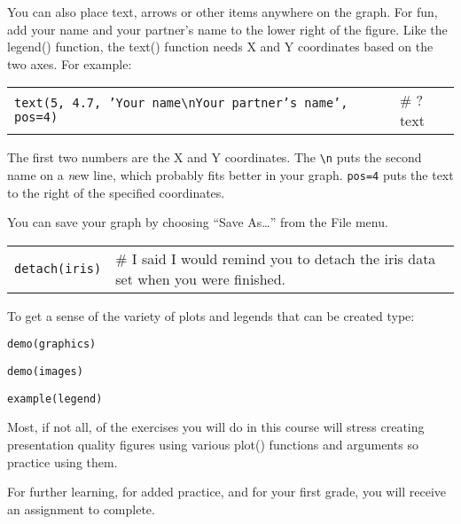 \documentclass[11pt]{article}
\begin{document}



You can also place text, arrows or other items anywhere on the graph.
For fun, add your name and your partner's name to the lower right of the
figure. Like the legend() function, the text() function needs X and Y
coordinates based on the two axes. For example:

\begin{tabular}{@{}L{4in}L{1.5in}@{}}
\texttt{text(5, 4.7, 'Your name\textbackslash{}nYour partner's name', pos=4)} & \# ?text\\

\end{tabular}

The first two numbers are the X and Y coordinates.  The \texttt{\textbackslash{}n} puts the second name on a \emph{n}ew line, which probably fits better in your graph. \texttt{pos=4} puts the text to the right of the specified coordinates.

You can save your graph by choosing ``Save As\ldots{}'' from the File
menu.

\begin{tabular}{@{}L{1in}L{4.5in}@{}}
\texttt{detach(iris)} & \# I said I would remind you to detach the iris data set
when you were finished. \\
\end{tabular}

To get a sense of the variety of plots and legends that can be created
type:

\texttt{demo(graphics)}

\texttt{demo(images)}

\texttt{example(legend)}

Most, if not all, of the exercises you will do in this course will
stress creating presentation quality figures using various plot()
functions and arguments so practice using them.

For further learning, for added practice, and for your first grade, you
will receive an assignment to complete.
\end{document}
